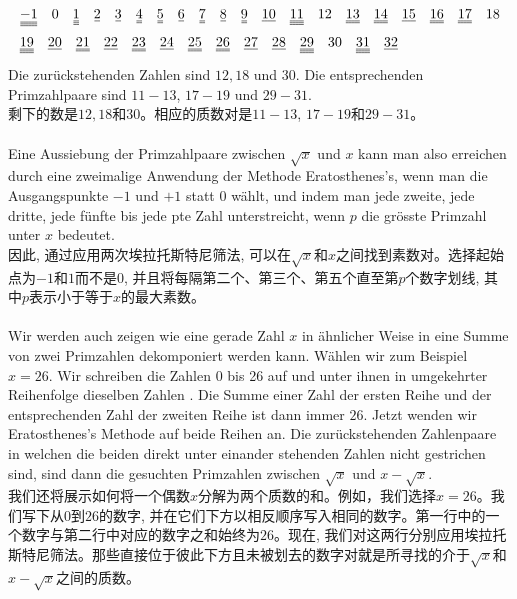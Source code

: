 \documentclass[UTF8,a4paper,zihao=-4]{article}
\renewcommand\underline{\bgroup\markoverwith
   {%
     \rule[-0.5ex]{2pt}{0.4pt}%
   }%
   \ULon}
\newcommand\doubleunderline{\bgroup\markoverwith
   {%
     \rule[-0.5ex]{2pt}{0.4pt}%
     \llap{{\rule[-0.8ex]{2pt}{0.4pt}}}%
   }%
   \ULon}
\newcommand\tripleunderline{\bgroup\markoverwith
   {%
     \rule[-0.5ex]{2pt}{0.4pt}%
     \llap{{\rule[-0.8ex]{2pt}{0.4pt}}}%
     \llap{{\rule[-1.1ex]{2pt}{0.4pt}}}%
   }%
   \ULon}
\begin{document}
\begin{align*}
&\tripleunderline{-1}\quad0\quad\tripleunderline1\quad\underline2\quad\underline3\quad\doubleunderline4\quad\doubleunderline5\quad\underline6\quad\doubleunderline7\quad\underline8\quad\doubleunderline9\quad\underline{10}\quad\tripleunderline{11}\quad12\quad\doubleunderline{13}\quad\doubleunderline{14}\quad\underline{15}\quad\doubleunderline{16}\quad\doubleunderline{17}\quad18\\
&\tripleunderline{19}\quad\underline{20}\quad\doubleunderline{21}\quad\underline{22}\quad\doubleunderline{23}\quad\underline{24}\quad\doubleunderline{25}\quad\doubleunderline{26}\quad\underline{27}\quad\underline{28}\quad\tripleunderline{29}\quad30\quad\tripleunderline{31}\quad\underline{32}
\end{align*}
Die zurückstehenden Zahlen sind $12,18$ und $30$. Die entsprechenden Primzahlpaare sind $11-13$, $17-19$ und $29-31$.\\
剩下的数是$12,18$和$30$。相应的质数对是$11-13$, $17-19$和$29-31$。\\\\
\indent Eine Aussiebung der Primzahlpaare zwischen $\sqrt{x}$ und $x$ kann man also erreichen durch eine zweimalige Anwendung der Methode Eratosthenes's, wenn man die Ausgangspunkte $-1$ und $+1$ statt $0$ wählt, und indem man jede zweite, jede dritte, jede fünfte bis jede pte Zahl unterstreicht, wenn $p$ die grösste Primzahl unter $x$ bedeutet.\\
\indent 因此, 通过应用两次埃拉托斯特尼筛法, 可以在$\sqrt{x}$和$x$之间找到素数对。选择起始点为$-1$和$1$而不是0, 并且将每隔第二个、第三个、第五个直至第$p$个数字划线, 其中$p$表示小于等于$x$的最大素数。\\\\
\indent Wir werden auch zeigen wie eine gerade Zahl $x$ in ähnlicher Weise in eine Summe von zwei Primzahlen dekomponiert werden kann. Wählen wir zum Beispiel $x=26$. Wir schreiben die Zahlen 0 bis 26 auf und unter ihnen in umgekehrter Reihenfolge dieselben Zahlen . Die Summe einer Zahl der ersten Reihe und der entsprechenden Zahl der zweiten Reihe ist dann immer $26$. Jetzt wenden wir Eratosthenes's Methode auf beide Reihen an. Die zurückstehenden Zahlenpaare in welchen die beiden direkt unter einander stehenden Zahlen nicht gestrichen sind, sind dann die gesuchten Primzahlen zwischen $\sqrt{x}$ und $x-\sqrt{x}$.\\
\indent 我们还将展示如何将一个偶数$x$分解为两个质数的和。例如，我们选择$x=26$。我们写下从$0$到$26$的数字, 并在它们下方以相反顺序写入相同的数字。第一行中的一个数字与第二行中对应的数字之和始终为$26$。现在, 我们对这两行分别应用埃拉托斯特尼筛法。那些直接位于彼此下方且未被划去的数字对就是所寻找的介于$\sqrt{x}$和$x-\sqrt{x}$之间的质数。
\end{document}
